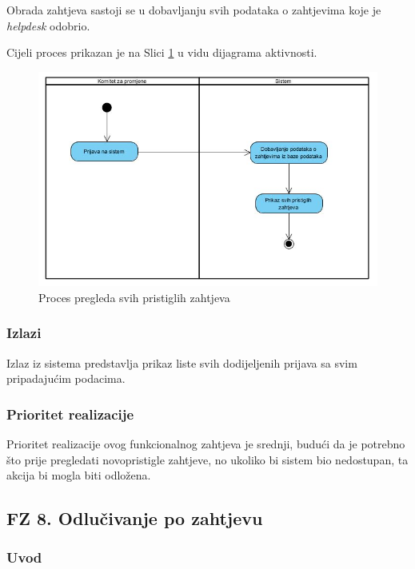 \documentclass[12pt,a4paper]{article}
\begin{document}
Obrada zahtjeva sastoji se u dobavljanju svih podataka o zahtjevima koje je \textit{helpdesk} odobrio.

Cijeli proces prikazan je na Slici \ref{act7} u vidu dijagrama aktivnosti.

\begin{figure}[H]
\center
\includegraphics[scale=0.5]{../res/Activity/activity7.JPG}
\caption{Proces pregleda svih pristiglih zahtjeva}
\label{act7}
\end{figure}

\subsubsection{Izlazi}

Izlaz iz sistema predstavlja prikaz liste svih dodijeljenih prijava sa svim pripadajućim podacima.

\subsubsection{Prioritet realizacije}

Prioritet realizacije ovog funkcionalnog zahtjeva je srednji, budući da je potrebno što prije pregledati novopristigle zahtjeve, no ukoliko bi sistem bio nedostupan, ta akcija bi mogla biti odložena.

\newpage

\subsection{FZ 8. Odlučivanje po zahtjevu}

\subsubsection{Uvod}
\end{document}
